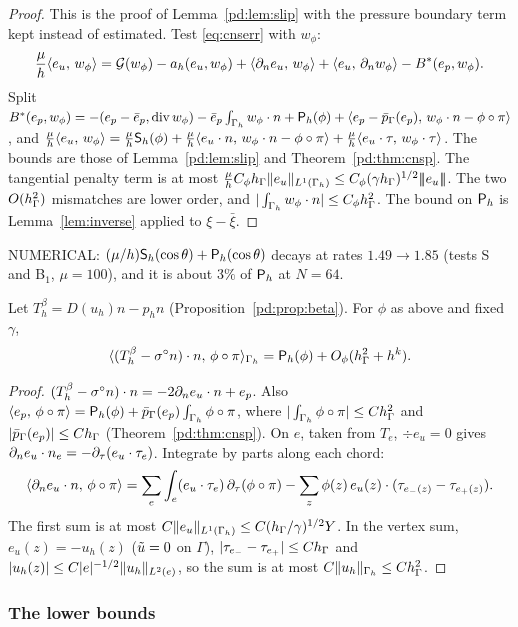 \begin{proof}
This is the proof of Lemma~\ref{pd:lem:slip} with the pressure boundary term kept instead of estimated. Test \eqref{eq:cnserr} with $w_\phi$:
\[
\frac\mu h\langle e_u,\, w_\phi\rangle=\mathcal G(w_\phi)-a_h(e_u,w_\phi)+\langle \partial_n e_u,\, w_\phi\rangle+\langle e_u,\, \partial_n w_\phi\rangle-B^\ast(e_p,w_\phi).
\]
Split $B^\ast(e_p,w_\phi)=-(e_p-\bar e_p,\operatorname{div} w_\phi)-\bar e_p\int_{\Gamma_h}w_\phi\cdot n+\mathsf P_h(\phi)+\langle e_p-\bar p_{\Gamma}(e_p),\, w_\phi\cdot n-\phi\circ\pi\rangle$, and $\frac\mu h\langle e_u,\, w_\phi\rangle=\frac\mu h\mathsf S_h(\phi)+\frac\mu h\langle e_u\cdot n,\, w_\phi\cdot n-\phi\circ\pi\rangle+\frac\mu h\langle e_u\cdot\tau,\, w_\phi\cdot\tau\rangle$. The bounds are those of Lemma~\ref{pd:lem:slip} and Theorem~\ref{pd:thm:cnsp}. The tangential penalty term is at most $\frac\mu hC_\phi h_\Gamma\lVert e_u\rVert_{L^1(\Gamma_h)}\le C_\phi(\gamma h_\Gamma)^{1/2}|\!|\!|e_u|\!|\!|$. The two $O(h_\Gamma^2)$ mismatches are lower order, and $|\int_{\Gamma_h}w_\phi\cdot n|\le C_\phi h_\Gamma^2$. The bound on $\mathsf P_h$ is Lemma~\ref{lem:inverse} applied to $\xi-\bar\xi$.
\end{proof}

NUMERICAL: $(\mu/h)\mathsf S_h(\cos\theta)+\mathsf P_h(\cos\theta)$ decays at rates $1.49\to1.85$ (tests S and B$_1$, $\mu=100$), and it is about $3\%$ of $\mathsf P_h$ at $N=64$.

\begin{lemma}\label{pd:lem:C1}
Let $T^\beta_h=D(u_h)n-p_hn$ (Proposition~\ref{pd:prop:beta}). For $\phi$ as above and fixed $\gamma$,
\[
\langle (T^\beta_h-\sigma^\circ n)\cdot n,\, \phi\circ\pi\rangle_{\Gamma_h}=\mathsf P_h(\phi)+O_\phi(h_\Gamma^2+h^k).
\]
\end{lemma}

\begin{proof}
$(T^\beta_h-\sigma^\circ n)\cdot n=-2\partial_n e_u\cdot n+e_p$. Also $\langle e_p,\, \phi\circ\pi\rangle=\mathsf P_h(\phi)+\bar p_{\Gamma}(e_p)\int_{\Gamma_h}\phi\circ\pi$, where $|\int_{\Gamma_h}\phi\circ\pi|\le Ch_\Gamma^2$ and $|\bar p_{\Gamma}(e_p)|\le Ch_\Gamma$ (Theorem~\ref{pd:thm:cnsp}). On $e$, taken from $T_e$, $\div e_u=0$ gives $\partial_n e_u\cdot n_e=-\partial_\tau(e_u\cdot\tau_e)$. Integrate by parts along each chord:
\[
\langle \partial_n e_u\cdot n,\, \phi\circ\pi\rangle=\sum_e\int_e(e_u\cdot\tau_e)\,\partial_\tau(\phi\circ\pi)-\sum_z\phi(z)\,e_u(z)\cdot(\tau_{e_-(z)}-\tau_{e_+(z)}).
\]
The first sum is at most $C\lVert e_u\rVert_{L^1(\Gamma_h)}\le C(h_\Gamma/\gamma)^{1/2}Y$. In the vertex sum, $e_u(z)=-u_h(z)$ ($\tilde u=0$ on $\Gamma$), $|\tau_{e_-}-\tau_{e_+}|\le Ch_\Gamma$ and $|u_h(z)|\le C|e|^{-1/2}\lVert u_h\rVert_{L^2(e)}$, so the sum is at most $C\lVert u_h\rVert_{\Gamma_h}\le Ch_\Gamma^2$.
\end{proof}

\subsubsection{The lower bounds}

